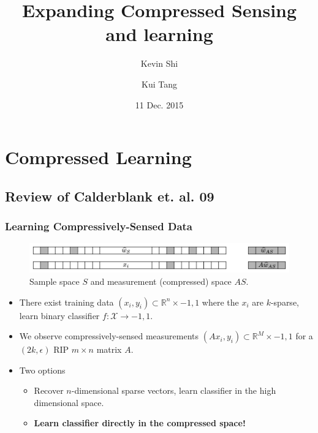 \documentclass[aspectratio=34]{beamer}
\title{Expanding Compressed Sensing and learning}
\author{Kevin Shi \and Kui Tang}
\institute{Columbia University}
\date{11 Dec. 2015}
\theoremstyle{plain}
\begin{document}
\frame{\titlepage}


\section{Compressed Learning}

\subsection{Review of Calderblank et. al. 09}

\begin{frame}
\frametitle{Learning Compressively-Sensed Data}
\begin{figure}
    \includegraphics[width=\columnwidth]{S_vs_AS.pdf}
    \caption{\label{fig:S_vs_AS}Sample space $S$ and measurement (compressed) space $AS$.}
\end{figure}
\begin{itemize}
    \item There exist training data ${(x_i,y_i)} \subset \mathbb{R}^n \times {-1,1}$ where the $x_i$ are $k$-sparse, learn binary classifier $f : \mathcal{X} \rightarrow {-1,1}$.
    \item We observe compressively-sensed measurements ${(Ax_i,y_i)} \subset \mathbb{R}^M \times {-1, 1}$ for a $(2k,\epsilon)$ RIP $m \times n$ matrix $A$.
    \item Two options
    \begin{itemize}
        \item Recover $n$-dimensional sparse vectors, learn classifier in the high dimensional space.
        \item \textbf{Learn classifier directly in the compressed space!}
    \end{itemize}
\end{itemize}
\end{frame}
\end{document}
